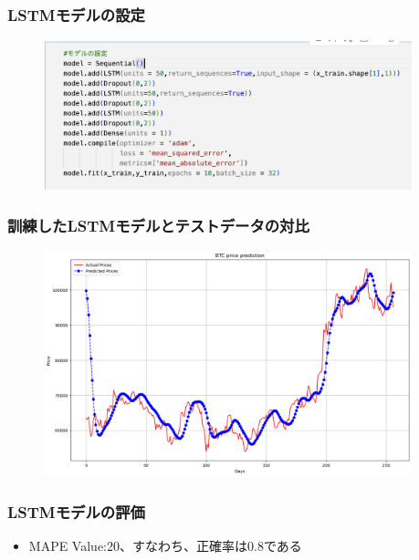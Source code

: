 \documentclass{beamer}  %
\begin{document}
\begin{frame}
    \frametitle{LSTMモデルの設定}
    \begin{figure}[h]
        \begin{center}
            \includegraphics[keepaspectratio, width=0.95\textwidth]{pic/dl1.png}
        \end{center}
    \end{figure}
\end{frame}

\begin{frame}
    \frametitle{訓練したLSTMモデルとテストデータの対比}
    \begin{figure}[h]
        \begin{center}
            \includegraphics[keepaspectratio, width=0.95\textwidth]{pic/dl2.png}
        \end{center}
    \end{figure}
\end{frame}

\begin{frame}
    \frametitle{LSTMモデルの評価}
    \begin{itemize}
        \item MAPE Value:20、すなわち、正確率は0.8である
    \end{itemize}
\end{frame}
\end{document}
